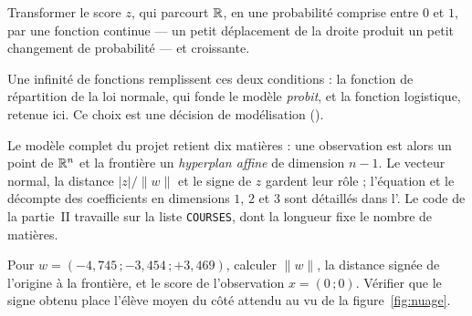 \begin{resultat}
Transformer le score $z$, qui parcourt $\mathbb{R}$, en une probabilité comprise entre
$0$ et $1$, par une fonction continue --- un petit déplacement de la droite
produit un petit changement de probabilité --- et croissante.

Une infinité de fonctions remplissent ces deux conditions : la fonction de
répartition de la loi normale, qui fonde le modèle \emph{probit}, et la fonction
logistique, retenue ici. Ce choix est une décision de modélisation
().
\end{resultat}

\enlargethispage{2\baselineskip}
Le modèle complet du projet retient dix matières : une observation est alors un
point de $\mathbb{R}^n$ et la frontière un \emph{hyperplan affine} de dimension $n-1$.
Le vecteur normal, la distance $|z|/\|w\|$ et le signe de $z$ gardent leur rôle ;
l'équation et le décompte des coefficients en dimensions $1$, $2$ et $3$ sont
détaillés dans l'. Le code de la partie~II travaille
sur la liste \texttt{COURSES}, dont la longueur fixe le nombre de matières.

\begin{exercice}
Pour $w=(-4{,}745\,;-3{,}454\,;+3{,}469)$, calculer $\|w\|$, la distance signée
de l'origine à la frontière, et le score de l'observation $x=(0\,;0)$. Vérifier
que le signe obtenu place l'élève moyen du côté attendu au vu de la
figure~\ref{fig:nuage}.
\end{exercice}
